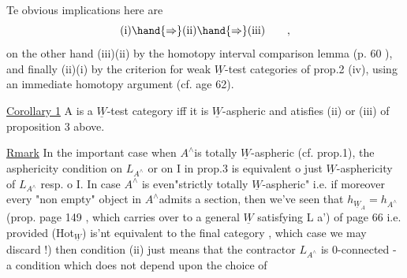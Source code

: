 Te obvious implications here are
\[ \text{(i)}\hand{\Rightarrow}\text{(ii)}\hand{\Rightarrow}\text{(iii)} \qquad , \]
on the other hand  (iii)\hand{$\Rightarrow$}(ii)  by the homotopy interval comparison
lemma  (p. 60 ),  and finally (ii)\hand{$\Rightarrow$}(i)    by the criterion 
for weak $\underline{W}$-test categories of prop.2 (iv),  using an immediate homotopy
argument (cf. age 62).

\uline{Corollary 1} A is a $\underline{W}$-test category iff it is $\underline{W}$-aspheric and atisfies
(ii) or (iii) of proposition 3 above.

\uline{Rmark}  In the important case when $A^\wedge$\hand{/}is totally $\underline{W}$-aspheric (cf. prop.1),
the asphericity condition on $L_{A^\wedge}$ or on I in prop.3  is equivalent o
just $\underline{W}$-asphericity of $L_{A^\wedge}$ resp. o I.  In case $A^\wedge$ is even"strictly
totally $\underline{W}$-aspheric"  i.e. if moreover every  "non empty" object in
$A^\wedge$admits a section,  then we've seen that $h_{\underline{W}_A} = h_{A^\wedge}$  (prop. page 149 ,
which carries over to a general $\underline{W}$ satisfying L a') of page 66\hand{,} i.e.
provided (Hot$_{\underline{W}}$)  is'nt equivalent to the final category ,  which case we
may discard !)\hand{,} then condition (ii) just means that the contractor $L_{A^\wedge}$
\margin{$\|$} is 0-connected  -  a condition which does not depend upon the choice of

